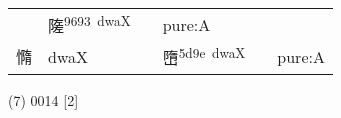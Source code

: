 \documentclass[14pt,a4paper]{scrartcl}
\begin{document}
\begin{longtable}[c]{@{}llllll@{}}
\begin{minipage}[t]{0.14\columnwidth}\raggedright\strut
\strut\end{minipage} &
\begin{minipage}[t]{0.14\columnwidth}\raggedright\strut
隓\textsuperscript{9693~dwaX}
\strut\end{minipage} &
\begin{minipage}[t]{0.14\columnwidth}\raggedright\strut
\strut\end{minipage} &
\begin{minipage}[t]{0.14\columnwidth}\raggedright\strut
pure:A
\strut\end{minipage}\tabularnewline
\begin{minipage}[t]{0.14\columnwidth}\raggedright\strut
憜
\strut\end{minipage} &
\begin{minipage}[t]{0.14\columnwidth}\raggedright\strut
dwaX
\strut\end{minipage} &
\begin{minipage}[t]{0.14\columnwidth}\raggedright\strut
\strut\end{minipage} &
\begin{minipage}[t]{0.14\columnwidth}\raggedright\strut
嶞\textsuperscript{5d9e~dwaX}
\strut\end{minipage} &
\begin{minipage}[t]{0.14\columnwidth}\raggedright\strut
\strut\end{minipage} &
\begin{minipage}[t]{0.14\columnwidth}\raggedright\strut
pure:A
\strut\end{minipage}\tabularnewline
\bottomrule
\end{longtable}

(7) 0014 {[}2{]}
\end{document}
